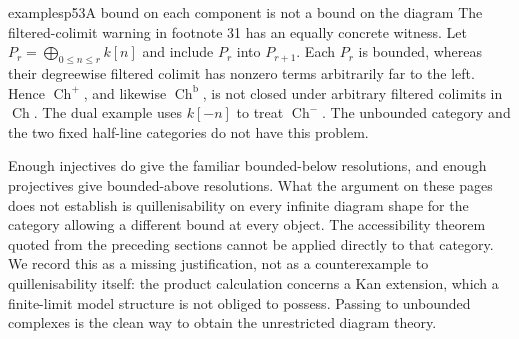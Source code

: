 \begin{dcomment}{examples}{p53}{A bound on each component is not a bound on the diagram}
The filtered-colimit warning in footnote 31 has an equally concrete witness. Let $P_r=\bigoplus_{0\leq n\leq r}k[n]$ and include $P_r$ into $P_{r+1}$. Each $P_r$ is bounded, whereas their degreewise filtered colimit has nonzero terms arbitrarily far to the left. Hence $\operatorname{Ch}^+$, and likewise $\operatorname{Ch}^{\mathrm b}$, is not closed under arbitrary filtered colimits in $\operatorname{Ch}$. The dual example uses $k[-n]$ to treat $\operatorname{Ch}^-$. The unbounded category and the two fixed half-line categories do not have this problem.

Enough injectives do give the familiar bounded-below resolutions, and enough projectives give bounded-above resolutions. What the argument on these pages does not establish is quillenisability on every infinite diagram shape for the category allowing a different bound at every object. The accessibility theorem quoted from the preceding sections cannot be applied directly to that category. We record this as a missing justification, not as a counterexample to quillenisability itself: the product calculation concerns a Kan extension, which a finite-limit model structure is not obliged to possess. Passing to unbounded complexes is the clean way to obtain the unrestricted diagram theory.
\end{dcomment}

